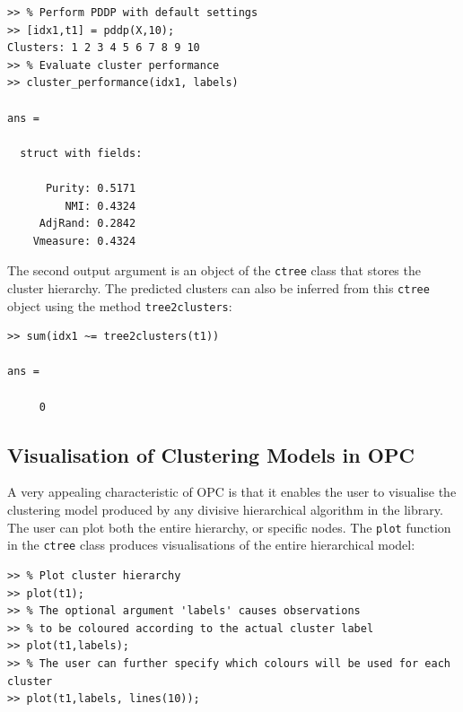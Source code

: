 \documentclass{book}
\begin{document}
\begin{lstlisting}
>> % Perform PDDP with default settings
>> [idx1,t1] = pddp(X,10);
Clusters: 1 2 3 4 5 6 7 8 9 10
>> % Evaluate cluster performance
>> cluster_performance(idx1, labels)

ans = 

  struct with fields:

      Purity: 0.5171
         NMI: 0.4324
     AdjRand: 0.2842
    Vmeasure: 0.4324

\end{lstlisting}


\noindent
%
The second output argument is an object of the {\tt ctree} class that stores the
cluster hierarchy.
%
The predicted clusters can also be inferred from this {\tt ctree} object using the
method {\tt tree2clusters}:


\begin{lstlisting}
>> sum(idx1 ~= tree2clusters(t1))

ans = 

     0

\end{lstlisting}



\subsection{Visualisation of Clustering Models in OPC}

\noindent
%
A very appealing characteristic of OPC is that it enables the user to visualise
the clustering model produced by any divisive hierarchical algorithm in the
library. The user can plot both the entire hierarchy, or specific nodes. The
{\tt plot} function in the {\tt ctree} class produces visualisations of the
entire hierarchical model:


\begin{lstlisting}
>> % Plot cluster hierarchy
>> plot(t1); 
>> % The optional argument 'labels' causes observations
>> % to be coloured according to the actual cluster label
>> plot(t1,labels); 
>> % The user can further specify which colours will be used for each cluster
>> plot(t1,labels, lines(10)); 
\end{lstlisting}
\end{document}
